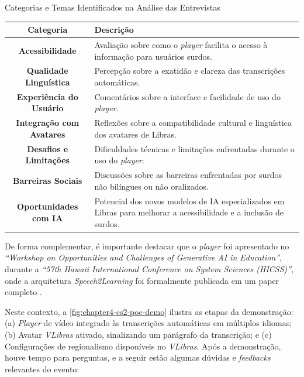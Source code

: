 \begin{quadro}[htb]
\centering
\caption{Categorias e Temas Identificados na Análise das Entrevistas}
\label{quadro:c4:cs2-grounded-theory}
\begin{tabular}{c|p{10cm}}
\hline
\textbf{Categoria}              & \textbf{Descrição}                                                                 \\ \hline
\textbf{Acessibilidade}         & Avaliação sobre como o \textit{player} facilita o acesso à informação para usuários surdos.  \\ \hline
\textbf{Qualidade Linguística}  & Percepção sobre a exatidão e clareza das transcrições automáticas.                 \\ \hline
\textbf{Experiência do Usuário} & Comentários sobre a interface e facilidade de uso do \textit{player}.                                \\ \hline
\textbf{Integração com Avatares}& Reflexões sobre a compatibilidade cultural e linguística dos avatares de Libras.    \\ \hline
\textbf{Desafios e Limitações}  & Dificuldades técnicas e limitações enfrentadas durante o uso do \textit{player}.            \\ \hline
\textbf{Barreiras Sociais}      & Discussões sobre as barreiras enfrentadas por surdos não bilíngues ou não oralizados.\\ \hline
\textbf{Oportunidades com IA}   & Potencial dos novos modelos de IA especializados em Libras para melhorar a acessibilidade e a inclusão de surdos.                  \\ \hline
\end{tabular}
\end{quadro}

De forma complementar, é importante destacar que o \textit{player} foi apresentado no \textit{``Workshop on Opportunities and Challenges of Generative AI in Education''}, durante a \textit{``57th Hawaii International Conference on System Sciences (HICSS)''}, onde a arquitetura \textit{Speech2Learning} foi formalmente publicada em um paper completo \cite{FalvoJr2023_HICSS}. 

Neste contexto, a \autoref{fig:chapter4-cs2-poc-demo} ilustra as etapas da demonstração: (a) \textit{Player} de vídeo integrado às transcrições automáticas em múltiplos idiomas; (b) Avatar \textit{VLibras} ativado, sinalizando um parágrafo da transcrição; e (c) Configurações de regionalismo disponíveis no \textit{VLibras}. Após a demonstração, houve tempo para perguntas, e a seguir estão algumas dúvidas e \textit{feedbacks} relevantes do evento:

